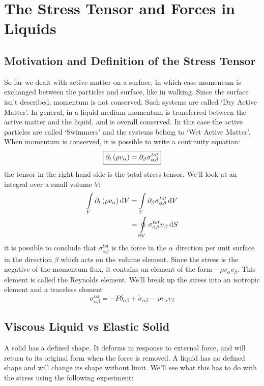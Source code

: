 \section{The Stress Tensor and Forces in Liquids}
\subsection{Motivation and Definition of the Stress Tensor}
So far we dealt with active matter on a surface, in which case momentum is exchanged between the particles and surface, like in walking. Since the surface isn't described, momentum is not conserved. Such systems are called `Dry Active Matter'. In general, in a liquid medium momentum is transferred between the active matter and the liquid, and is overall conserved. In this case the active particles are called `Swimmers' and the systems belong to `Wet Active Matter'. When momentum is conserved, it is possible to write a continuity equation:
\begin{equation}
    \boxed{\partial_t\left(\rho v_\alpha\right) = \partial_\beta\sigma_{\alpha\beta}^{tot}}
\end{equation}
the tensor in the right-hand side is the total stress tensor. We'll look at an integral over a small volume \(V\):
\begin{align}
    \int\limits_V\partial_t\left(\rho v_\alpha\right)\mathop{}\!\mathrm{d} V &= \int\limits_V \partial_\beta\sigma_{\alpha\beta}^{tot}\mathop{}\!\mathrm{d} V\\
    &= \oint\limits_{\partial V}\sigma_{\alpha\beta}^{tot}n_\beta\mathop{}\!\mathrm{d} S
\end{align}
it is possible to conclude that \(\sigma_{\alpha\beta}^{tot}\) is the force in the \(\alpha \) direction per unit surface in the direction \(\beta \) which acts on the volume element. Since the stress is the negative of the momentum flux, it contains an element of the form \(-\rho v_\alpha v_\beta \). This element is called the Reynolds element. We'll break up the stress into an isotropic element and a traceless element
\begin{equation}
    \boxed{\sigma_{\alpha\beta}^{tot} = -P\delta_{\alpha\beta}+\tilde{\sigma}_{\alpha\beta}-\rho v_\alpha v_\beta}
\end{equation}
\subsection{Viscous Liquid vs Elastic Solid}
A solid has a defined shape. It deforms in response to external force, and will return to its original form when the force is removed. A liquid has no defined shape and will change its shape without limit. We'll see what this has to do with the stress using the following experiment:

